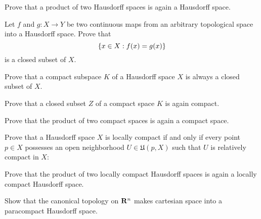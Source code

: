 \begin{xca}
  Prove that a product of two Hausdorff spaces is again a Hausdorff space.
\end{xca}

\begin{xca}
  Let $f$ and $g\colon X \to Y$ be two continuous maps from an arbitrary  
  topological space into a Hausdorff space. Prove that
  \[
    \lbrace x \in X: f(x) = g(x)\rbrace
  \]
  is a closed subset of $X$.
\end{xca}

\begin{xca}
  Prove that a compact subspace $K$ of a Hausdorff space $X$ is always a closed subset
  of $X$.
\end{xca}

\begin{xca}
  Prove that a closed subset $Z$ of a compact space $K$ is again compact.
\end{xca}

\begin{xca}
  Prove that the product of two compact spaces is again a compact space.
\end{xca}

\begin{xca}
  Prove that a Hausdorff space $X$ is locally compact if and only if every point
  $p \in X$ possesses an open neighborhood $U \in \mathfrak U(p, X)$ such that
  $U$ is relatively compact in $X$:
\end{xca}

\begin{xca}
  Prove that the product of two locally compact Hausdorff spaces is again a
  locally compact Hausdorff space.
\end{xca}

\begin{xca}
  Show that the canonical topology on $\mathbf{R}^n$ makes cartesian space into
  a paracompact Hausdorff space.
\end{xca}


